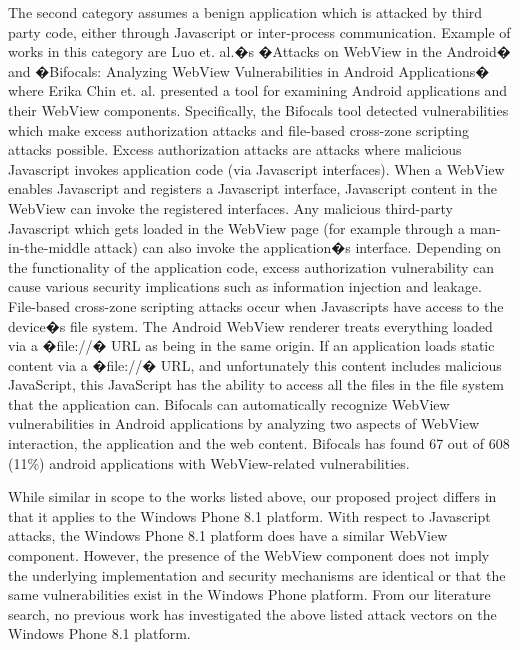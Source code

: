 \documentclass[conference]{IEEEtran}
\begin{document}
The second category assumes a benign application which is attacked by third party code, either through Javascript or inter-process communication.
Example of works in this category are Luo et. al.�s �Attacks on WebView in the Android� \cite{luo2011attacks} and �Bifocals: Analyzing WebView Vulnerabilities in Android Applications�  \cite{chin2014bifocals} where Erika Chin et. al. presented a tool for examining Android applications and their WebView components.
Specifically, the Bifocals tool detected vulnerabilities which make excess authorization attacks and file-based cross-zone scripting attacks possible.
Excess authorization attacks are attacks where malicious Javascript invokes application code (via Javascript interfaces).
When a WebView enables Javascript and registers a Javascript interface, Javascript content in the WebView can invoke the registered interfaces.
Any malicious third-party Javascript which gets loaded in the WebView page (for example through a man-in-the-middle attack) can also invoke the application�s interface.
Depending on the functionality of the application code, excess authorization vulnerability can cause various security implications such as information injection and leakage.
File-based cross-zone scripting attacks occur when Javascripts have access to the device�s file system.
The Android WebView renderer treats everything loaded via a �file://� URL as being in the same origin.
If an application loads static content via a �file://� URL, and  unfortunately this content includes malicious JavaScript, this JavaScript has the ability to access all the files in the file system that the application can.
Bifocals can automatically recognize WebView vulnerabilities in Android applications by analyzing two aspects of WebView interaction, the application and the web content.
Bifocals has found 67 out of 608 (11\%) android applications with WebView-related vulnerabilities.

While similar in scope to the works listed above, our proposed project differs in that it applies to the Windows Phone 8.1 platform.
With respect to Javascript attacks, the Windows Phone 8.1 platform does have a similar WebView component. 
However, the presence of the WebView component does not imply the underlying implementation and security mechanisms are identical or that the same vulnerabilities exist in the Windows Phone platform.
From our literature search, no previous work has investigated the above listed attack vectors on the Windows Phone 8.1 platform.
\end{document}
